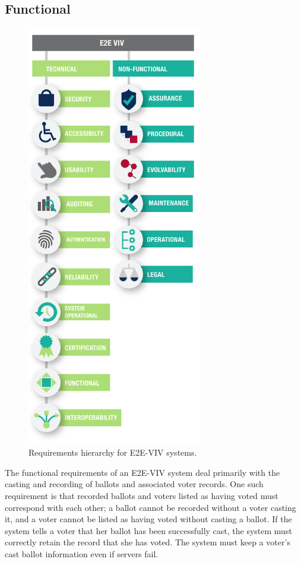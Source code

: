 \subsection{Functional} 
\label{sec:functional}

\begin{figure}
\begin{center}
\vspace*{-2ex}
\includegraphics[width=3in]{required_properties_resources/hierarchy}
\end{center}
\caption{Requirements hierarchy for E2E-VIV systems.}
\label{fig:e2eviv_requirements_hierarchy}
\end{figure}

The functional requirements of an E2E-VIV system deal primarily with
the casting and recording of ballots and associated voter records. One
such requirement is that recorded ballots and voters listed as having
voted must correspond with each other; a ballot cannot be recorded
without a voter casting it, and a voter cannot be listed as having
voted without casting a ballot. If the system tells a voter that her
ballot has been successfully cast, the system must correctly retain
the record that she has voted. The system must keep a voter's cast
ballot information even if servers fail.

